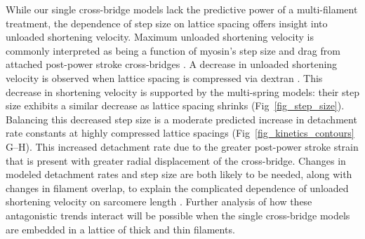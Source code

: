 \documentclass[10pt]{article}
\begin{document}
While our single cross-bridge models lack the predictive power of a multi-filament treatment, the dependence of step size on lattice spacing offers insight into unloaded shortening velocity. 
Maximum unloaded shortening velocity is commonly interpreted as being a function of myosin's step size and drag from attached post-power stroke cross-bridges \cite{Gordon2000}. 
A decrease in unloaded shortening velocity is observed when lattice spacing is compressed via dextran \cite{Goldman1987, Metzger1987}. 
This decrease in shortening velocity is supported by the multi-spring models: their step size exhibits a similar decrease as lattice spacing shrinks (Fig~\ref{fig_step_size}). 
Balancing this decreased step size is a moderate predicted increase in detachment rate constants at highly compressed lattice spacings (Fig~\ref{fig_kinetics_contours} G--H). 
This increased detachment rate due to the greater post-power stroke strain that is present with greater radial displacement of the cross-bridge. 
Changes in modeled detachment rates and step size are both likely to be needed, along with changes in filament overlap, to explain the complicated dependence of unloaded shortening velocity on sarcomere length \cite{Edman1979}. 
Further analysis of how these antagonistic trends interact will be possible when the single cross-bridge models are embedded in a lattice of thick and thin filaments. 
\end{document}
